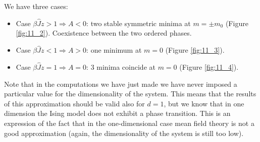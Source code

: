 \documentclass[../main/main.tex]{subfiles}
\begin{document}
We have three cases:

\begin{itemize}
\item Case \( \beta \hat{J} z > 1 \Rightarrow A<0 \): two stable symmetric minima at \( m= \pm m_0 \) (Figure \ref{fig:11_2}). Coexistence between the two ordered phases.
\item Case \( \beta \hat{J} z < 1 \Rightarrow A>0 \): one minimum at \( m=0 \) (Figure \ref{fig:11_3}).
\item Case \( \beta \hat{J} z = 1 \Rightarrow A=0 \): 3 minima coincide at \( m=0 \) (Figure \ref{fig:11_4}).
\end{itemize}

\begin{remark}
Note that in the computations we have just made we have never imposed a particular value for the dimensionality of the system. This means that the results of this approximation should be valid also for \(d=1\), but we know that in one dimension the Ising model does not exhibit a phase transition. This is an expression of the fact that in the one-dimensional case mean field theory is not a good approximation (again, the dimensionality of the system is still too low).
\end{remark}
\end{document}
